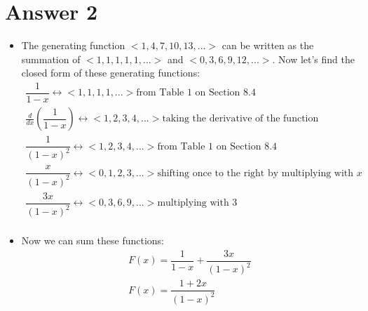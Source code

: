 \documentclass[12pt]{article}
\begin{document}
\section*{Answer 2}
\begin{itemize}
 \item The generating function $<1,4,7,10,13,...>$ can be written as the summation of $<1,1,1,1,1,...>$ and $<0,3,6,9,12,...>$. Now let's find the closed form of these generating functions:
 \begin{equation*}
    \begin{aligned}
     \dfrac{1}{1-x}\leftrightarrow <1,1,1,1,...>\text{from Table 1 on Section 8.4}\\
        \frac{d}{dx}(\dfrac{1}{1-x})\leftrightarrow <1,2,3,4,...> \text{taking the derivative of the function}\\
        \dfrac{1}{(1-x)^2}\leftrightarrow <1,2,3,4,...> \text{from Table 1 on Section 8.4}\\
        \dfrac{x}{(1-x)^2}\leftrightarrow <0,1,2,3,...> \text{shifting once to the right by multiplying with $x$}\\
        \dfrac{3x}{(1-x)^2}\leftrightarrow <0,3,6,9,...>\text{multiplying with $3$}\\
    \end{aligned}
 \end{equation*}
\item Now we can sum these functions:
\begin{equation*}
    \begin{split}
        F(x) = \dfrac{1}{1-x} + \dfrac{3x}{(1-x)^2}\\
        F(x) = \dfrac{1+2x}{(1-x)^2}
    \end{split}
 \end{equation*}
\end{itemize}
\end{document}
